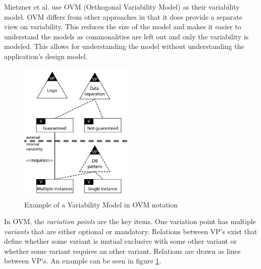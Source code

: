 Mietzner et al. \cite{mietzner2009variability} use OVM (Orthogonal Variability Model) as their variability model. OVM differs from other approaches in that it does provide a separate view on variability. This reduces the size of the model and makes it easier to understand the models as commonalities are left out and only the variability is modeled. This allows for understanding the model without understanding the application's design model.

\begin{figure}[htr]
    \centering
    \includegraphics[width=0.48\textwidth]{assets/OVM}
    \caption{Example of a Variability Model in OVM notation}
    \label{fig:ovm}
\end{figure}

In OVM, the \textit{variation points} are the key items. One variation point has multiple \textit{variants} that are either optional or mandatory. Relations between VP's exist that define whether some variant is mutual exclusive with some other variant or whether some variant requires an other variant. Relations are drawn as lines between VP's. An example can be seen in figure \ref{fig:ovm}.



